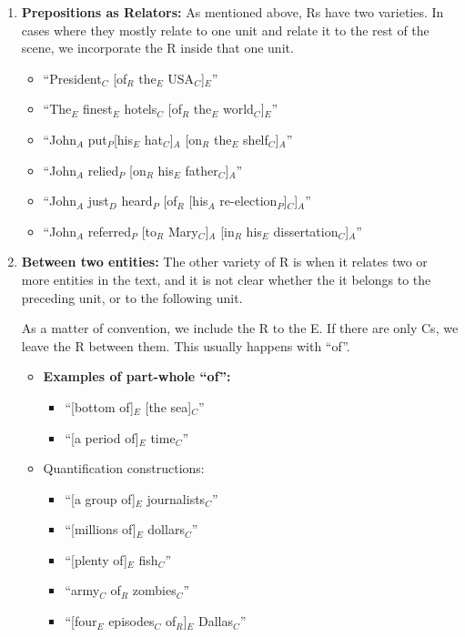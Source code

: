 \documentclass[11pt]{article}
\begin{document}
\begin{enumerate}
\item
{\bf Prepositions as Relators:} As mentioned above, Rs have two varieties. In cases where they mostly relate to one unit and relate it to the rest of the scene, we incorporate the R inside that one unit.
\begin{itemize}
\item
``President$_C$ [of$_R$ the$_E$ USA$_C$]$_E$''
\item
``The$_E$ finest$_E$ hotels$_C$ [of$_R$ the$_E$ world$_C$]$_E$''
\item
``John$_A$ put$_P $[his$_E$ hat$_C$]$_A$ [on$_R$ the$_E$ shelf$_C$]$_A$''
\item
``John$_A$ relied$_P$ [on$_R$ his$_E$ father$_C$]$_A$''
\item
``John$_A$ just$_D$ heard$_P$ [of$_R$ [his$_A$ re-election$_P$]$_C$]$_A$''
\item
``John$_A$ referred$_P$ [to$_R$ Mary$_C$]$_A$ [in$_R$ his$_E$ dissertation$_C$]$_A$''
\end{itemize}

\item
{\bf Between two entities:} The other variety of R is when it relates two or more entities in the text, and it is not clear whether the it belongs to the preceding unit, or to the following unit.

As a matter of convention, we include the R to the E. If there are only Cs, we leave the R between them. This usually happens with ``of''.

\begin{itemize}
\item
{\bf Examples of part-whole ``of'':}
\begin{itemize}
\item
``[bottom of]$_E$ [the sea]$_C$''
\item
``[a period of]$_E$ time$_C$''
\end{itemize}

\item
Quantification constructions:
\begin{itemize}
\item ``[a group of]$_E$ journalists$_C$''
\item ``[millions of]$_E$ dollars$_C$''
\item ``[plenty of]$_E$ fish$_C$''
\item  ``army$_C$ of$_R$ zombies$_C$''
\item ``[four$_E$ episodes$_C$ of$_R$]$_E$ Dallas$_C$''
\end{itemize}


\end{itemize}
\end{enumerate}
\end{document}
